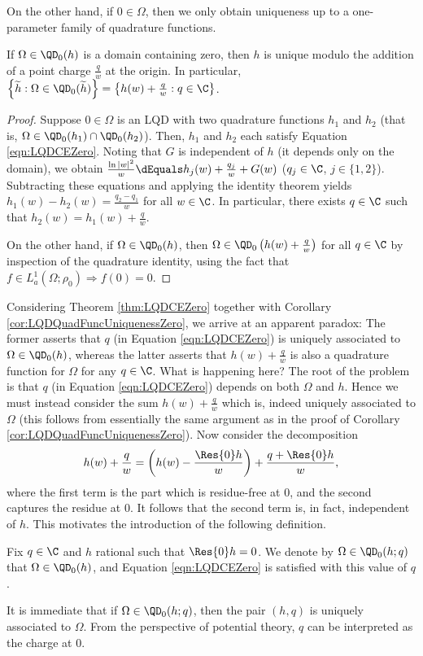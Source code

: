 \documentclass{article}
\numberwithin{equation}{section}
\begin{document}
On the other hand, if $0\in\Omega$, then we only obtain uniqueness up to a one-parameter family of quadrature functions.
\begin{corollary}\label{cor:LQDQuadFuncUniquenessZero}
    If $\Omega\in\QD_0(h)$ is a domain containing zero, then $h$ is unique modulo the addition of a point charge $\frac{q}{w}$ at the origin. In particular, $\left\{\widetilde{h}:\Omega\in\QD_0(\widetilde{h})\right\}=\left\{h(w)+\frac{q}{w}:q\in\C\right\}$.
\end{corollary}
\begin{proof}
Suppose $0\in\Omega$ is an LQD with two quadrature functions $h_1$ and $h_2$ (that is, $\Omega\in\QD_0(h_1)\cap\QD_0(h_2)$). Then, $h_1$ and $h_2$ each satisfy Equation \ref{eqn:LQDCEZero}. Noting that $G$ is independent of $h$ (it depends only on the domain), we obtain $\frac{\ln|w|^2}{w}\dEquals h_j(w)+\frac{q_j}{w}+G(w)$ ($q_j\in\C$, $j\in\{1,2\}$). Subtracting these equations and applying the identity theorem yields $h_1(w)-h_2(w)=\frac{q_2-q_1}{w}$ for all $w\in\C$. In particular, there exists $q\in\C$ such that $h_2(w)=h_1(w)+\frac{q}{w}$. 

On the other hand, if $\Omega\in\QD_0(h)$, then $\Omega\in\QD_0\left(h(w)+\frac{q}{w}\right)$ for all $q\in\C$ by inspection of the quadrature identity, using the fact that $f\in L_a^1(\Omega;\rho_0)\Rightarrow f(0)=0$.
\end{proof}


Considering Theorem \ref{thm:LQDCEZero} together with Corollary \ref{cor:LQDQuadFuncUniquenessZero}, we arrive at an apparent paradox: The former asserts that $q$ (in Equation \ref{eqn:LQDCEZero}) is uniquely associated to $\Omega\in\QD_0(h)$, whereas the latter asserts that $h(w)+\frac{q}{w}$ is also a quadrature function for $\Omega$ for any $q\in\C$. What is happening here? The root of the problem is that $q$ (in Equation \ref{eqn:LQDCEZero}) depends on both $\Omega$ and $h$. Hence we must instead consider the sum $h(w)+\frac{q}{w}$ which is, indeed uniquely associated to $\Omega$ (this follows from essentially the same argument as in the proof of Corollary \ref{cor:LQDQuadFuncUniquenessZero}). Now consider the decomposition
$$h(w)+\frac{q}{w}=\left(h(w)-\dfrac{\Res{0}h}{w}\right)+\frac{q+\Res{0}h}{w},$$
where the first term is the part which is residue-free at $0$, and the second captures the residue at $0$. It follows that the second term is, in fact, independent of $h$. This motivates the introduction of the following definition. 
\begin{definition}\label{def:QD0hq}
    Fix $q\in\C$ and $h$ rational such that $\Res{0}h=0$. We denote by $\Omega\in\QD_0(h;q)$ that $\Omega\in\QD_0(h)$, and Equation \ref{eqn:LQDCEZero} is satisfied with this value of $q$.
\end{definition}
It is immediate that if $\Omega\in\QD_0(h;q)$, then the pair $(h,q)$ is uniquely associated to $\Omega$. From the perspective of potential theory, $q$ can be interpreted as the charge at $0$. 
\end{document}
